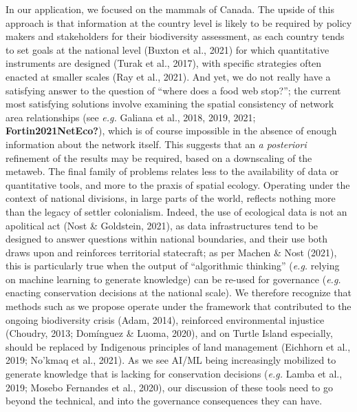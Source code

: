 \documentclass[11pt]{article}
\begin{document}
In our application, we focused on the mammals of Canada. The upside of
this approach is that information at the country level is likely to be
required by policy makers and stakeholders for their biodiversity
assessment, as each country tends to set goals at the national level
(Buxton et al., 2021) for which quantitative instruments are designed
(Turak et al., 2017), with specific strategies often enacted at smaller
scales (Ray et al., 2021). And yet, we do not really have a satisfying
answer to the question of ``where does a food web stop?''; the current
most satisfying solutions involve examining the spatial consistency of
network area relationships (see \emph{e.g.} Galiana et al., 2018, 2019,
2021; \textbf{Fortin2021NetEco?}), which is of course impossible in the
absence of enough information about the network itself. This suggests
that an \emph{a posteriori} refinement of the results may be required,
based on a downscaling of the metaweb. The final family of problems
relates less to the availability of data or quantitative tools, and more
to the praxis of spatial ecology. Operating under the context of
national divisions, in large parts of the world, reflects nothing more
than the legacy of settler colonialism. Indeed, the use of ecological
data is not an apolitical act (Nost \& Goldstein, 2021), as data
infrastructures tend to be designed to answer questions within national
boundaries, and their use both draws upon and reinforces territorial
statecraft; as per Machen \& Nost (2021), this is particularly true when
the output of ``algorithmic thinking'' (\emph{e.g.} relying on machine
learning to generate knowledge) can be re-used for governance
(\emph{e.g.} enacting conservation decisions at the national scale). We
therefore recognize that methods such as we propose operate under the
framework that contributed to the ongoing biodiversity crisis (Adam,
2014), reinforced environmental injustice (Choudry, 2013; Domínguez \&
Luoma, 2020), and on Turtle Island especially, should be replaced by
Indigenous principles of land management (Eichhorn et al., 2019; No'kmaq
et al., 2021). As we see AI/ML being increasingly mobilized to generate
knowledge that is lacking for conservation decisions (\emph{e.g.} Lamba
et al., 2019; Mosebo Fernandes et al., 2020), our discussion of these
tools need to go beyond the technical, and into the governance
consequences they can have.
\end{document}
